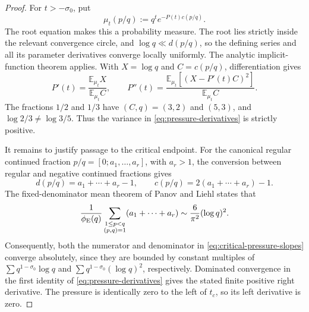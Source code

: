 \begin{proof}
For \(t>-\sigma_0\), put
\[
 \mu_t(p/q):=q^t e^{-P(t)c(p/q)}.
\]
The root equation makes this a probability measure.  The root lies strictly
inside the relevant convergence circle, and
\(\log q\ll d(p/q)\), so the defining series and all its parameter
derivatives converge locally uniformly.  The analytic implicit-function
theorem applies.  With \(X=\log q\) and \(C=c(p/q)\), differentiation gives
\begin{equation}
 P'(t)=\frac{\mathbb E_{\mu_t}X}{\mathbb E_{\mu_t}C},
 \qquad
 P''(t)=
 \frac{\mathbb E_{\mu_t}[(X-P'(t)C)^2]}
      {\mathbb E_{\mu_t}C}.
 \label{eq:pressure-derivatives}
\end{equation}
The fractions \(1/2\) and \(1/3\) have \((C,q)=(3,2)\) and \((5,3)\),
and \(\log2/3\ne\log3/5\).  Thus the variance in
\eqref{eq:pressure-derivatives} is strictly positive.

It remains to justify passage to the critical endpoint.  For the canonical
regular continued fraction \(p/q=[0;a_1,\ldots,a_r]\), with \(a_r>1\),
the conversion between regular and negative continued fractions gives
\[
 d(p/q)=a_1+\cdots+a_r-1,
 \qquad c(p/q)=2(a_1+\cdots+a_r)-1.
\]
The fixed-denominator mean theorem of Panov and Liehl
\cite{Panov1982,Liehl1983,AistleitnerBordaHauke2023} states that
\[
 \frac1{\phi_{\rm E}(q)}
 \sum_{\substack{1\le p<q\\(p,q)=1}}(a_1+\cdots+a_r)
 \sim\frac6{\pi^2}(\log q)^2.
\]
Consequently, both the numerator and denominator in
\eqref{eq:critical-pressure-slopes} converge absolutely, since they are
bounded by constant multiples of
\(\sum q^{1-\sigma_0}\log q\) and
\(\sum q^{1-\sigma_0}(\log q)^2\), respectively.  Dominated convergence in
the first identity of \eqref{eq:pressure-derivatives} gives the stated finite
positive right derivative.  The pressure is identically zero to the left of
\(t_c\), so its left derivative is zero.
\end{proof}

